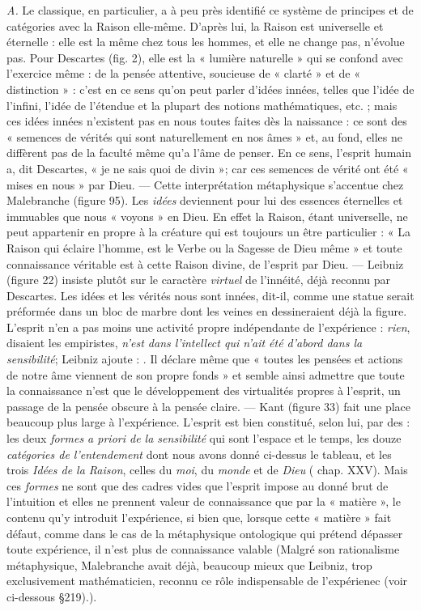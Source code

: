 {\it A.} Le  classique, en particulier, a à peu près identifié
ce système de principes et de catégories avec la Raison elle-même.
D’après lui, la Raison est universelle et éternelle : elle est la même
chez tous les hommes, et elle ne change pas, n’évolue pas. Pour
Descartes (fig. 2), elle est la « lumière naturelle » qui se confond
avec l’exercice même : de la pensée attentive, soucieuse de « clarté »
et de « distinction » : c’est en ce sens qu’on peut parler d'idées innées,
telles que l’idée de l'infini, l’idée de l’étendue et la plupart des notions
mathématiques, etc. ; mais ces idées innées n’existent pas en nous
toutes faites dès la naissance : ce sont des « semences de vérités qui
sont naturellement en nos âmes » et, au fond, elles ne diffèrent pas
de la faculté même qu’a l’âme de penser. En ce sens, l’esprit humain a,
dit Descartes, « je ne sais quoi de divin »; car ces semences de vérité
ont été « mises en nous » par Dieu. — Cette interprétation
métaphysique s’accentue chez Malebranche (figure 95). Les
{\it idées} deviennent pour lui des
essences éternelles et immuables que nous « voyons » en Dieu.
En effet la Raison, étant universelle, ne peut appartenir en
propre à la créature qui est toujours un être particulier :
« La Raison qui éclaire l’homme, est le Verbe ou la Sagesse de
Dieu même » et toute connaissance véritable est 
à cette Raison divine,  de l'esprit par Dieu. —
Leibniz (figure 22) insiste plutôt sur le caractère {\it virtuel}
de l’innéité, déjà reconnu par Descartes. Les idées et les vérités
nous sont innées, dit-il, comme une statue serait préformée dans
un bloc de marbre dont les veines en dessineraient déjà la
figure. L’esprit n’en a pas moins une activité propre indépendante
de l’expérience : {\it rien}, disaient
les empiristes, {\it n’est dans l’intellect qui n'ait été d’abord dans
la sensibilité}; Leibniz ajoute : . Il
déclare même que « toutes les pensées et actions de notre âme
viennent de son propre fonds » et semble ainsi admettre que
toute la connaissance n’est que le développement des virtualités
propres à l’esprit, un passage de la pensée obscure à la pensée claire.
— Kant (figure 33) fait une place beaucoup plus large à l’expérience. L’esprit est bien constitué, selon lui, par des  : les deux {\it formes a priori de la sensibilité} qui sont l’espace
et le temps, les douze {\it catégories de l’entendement} dont nous avons
donné ci-dessus le tableau, et les trois {\it Idées de la Raison}, celles
du {\it moi}, du {\it monde} et de {\it Dieu} ( chap. XXV). Mais ces {\it formes} ne sont
que des cadres vides que l’esprit impose au donné brut de l'intuition
et elles ne prennent valeur de connaissance que par la « matière », le
contenu qu'y introduit l'expérience, si bien que, lorsque cette
« matière » fait défaut, comme dans le cas de la métaphysique ontologique qui prétend dépasser toute expérience, il n’est plus de connaissance valable {\scriptsize (Malgré son rationalisme métaphysique, Malebranche avait déjà, beaucoup
mieux que Leibniz, trop exclusivement mathématicien, reconnu ce rôle indispensable
de l’expérienec (voir ci-dessous \S 219).)}.

